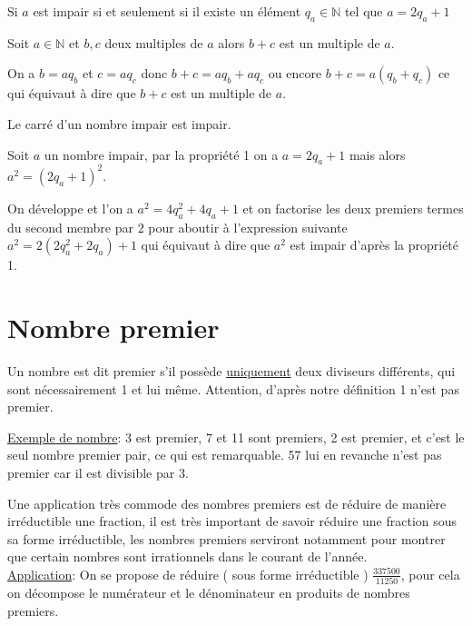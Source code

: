 \documentclass[french]{book}
\begin{document}
\begin{prop}
Si $a$ est impair si et seulement si il existe un élément $q_{a} \in \mathbb{N}$ tel que $a=2q_{a}+1$
\end{prop}
\begin{thm}
Soit $a \in \mathbb{N}$ et $b,c$ deux multiples de $a$ alors $b+c$ est un multiple de $a$.
\end{thm}
\begin{demo}
On a $b=aq_b$ et $c=aq_c$ donc $b+c=aq_b+aq_c$ ou encore $b+c=a(q_b+q_c)$ ce qui équivaut à dire que $b+c$ est un multiple de $a$.
\end{demo}
\begin{thm}
Le carré d'un nombre impair est impair.
\end{thm}
\begin{demo}
Soit $a$ un nombre impair, par la propriété 1 on a $a=2q_{a}+1$ mais alors $a^2=(2q_{a}+1)^2$. 

On développe et l'on a $a^2=4q_{a}^2+ 4q_{a}+1$ et on factorise les deux premiers termes du second membre par $2$ pour aboutir à l'expression suivante $a^2=2( 2q_{a}^2+2q_{a} )+1$ qui équivaut à dire que $a^2$ est impair d'après la propriété 1.
\end{demo}

\section{Nombre premier}




\begin{defn}
Un nombre est dit premier s'il possède \underline{uniquement} deux diviseurs différents, qui sont nécessairement 1 et lui même.
Attention, d'après notre définition 1 n'est pas premier.
\end{defn}

\underline{Exemple de nombre}: 3 est premier, 7 et 11 sont premiers, 2 est premier, et c'est le seul nombre premier pair, ce qui est remarquable. 57 lui en revanche n'est pas premier car il est divisible par 3.

Une application très commode des nombres premiers est de réduire de manière irréductible une fraction, il est très important de savoir réduire une fraction sous sa forme irréductible, les nombres premiers serviront notamment pour montrer que certain nombres sont irrationnels dans le courant de l'année.\\


\underline{Application}: On se propose de réduire ( sous forme irréductible ) $\frac{ 337 500}{11 250}$, pour cela on décompose le numérateur et le dénominateur en produits de nombres premiers.
\end{document}
